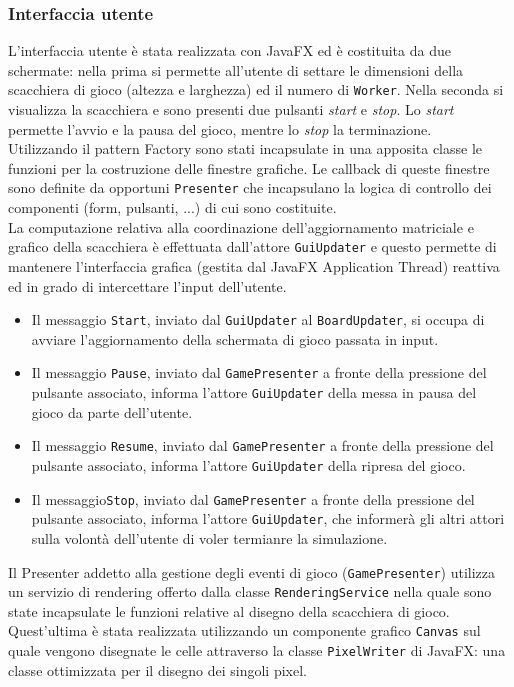 \documentclass[a4paper]{report}
\begin{document}
\subsubsection{Interfaccia utente}\label{interfaccia-utente-1}
L’interfaccia utente è stata realizzata con JavaFX ed è costituita da due schermate: nella prima si permette all’utente di settare le dimensioni della scacchiera di gioco (altezza e larghezza) ed il numero di \texttt{Worker}. Nella seconda si visualizza la scacchiera e sono presenti due pulsanti \textit{start} e \textit{stop}. Lo \textit{start} permette l’avvio e la pausa del gioco, mentre lo \textit{stop} la terminazione.\\
Utilizzando il pattern Factory sono stati incapsulate in una apposita classe le funzioni per la costruzione delle finestre grafiche. Le callback di queste finestre sono definite da opportuni \texttt{Presenter} che incapsulano la logica di controllo dei componenti (form, pulsanti, ...) di cui sono costituite.\\
La computazione relativa alla coordinazione dell’aggiornamento matriciale e grafico della scacchiera è effettuata dall'attore \texttt{GuiUpdater} e questo permette di mantenere l’interfaccia grafica (gestita dal JavaFX Application Thread) reattiva ed in grado di intercettare l’input dell’utente.

\begin{itemize}
    \item Il messaggio \texttt{Start}, inviato dal \texttt{GuiUpdater} al \texttt{BoardUpdater}, si occupa di avviare l'aggiornamento della schermata di gioco passata in input.
%
    \item Il messaggio \texttt{Pause}, inviato dal \texttt{GamePresenter} a fronte della pressione del pulsante associato, informa l'attore \texttt{GuiUpdater} della messa in pausa del gioco da parte dell'utente.
%
    \item Il messaggio \texttt{Resume}, inviato dal \texttt{GamePresenter} a fronte della pressione del pulsante associato, informa l'attore \texttt{GuiUpdater} della ripresa del gioco.
%
    \item Il messaggio\texttt{Stop}, inviato dal \texttt{GamePresenter} a fronte della pressione del pulsante associato, informa l'attore \texttt{GuiUpdater}, che informerà gli altri attori sulla volontà dell'utente di voler termianre la simulazione.
%
\end{itemize}

Il Presenter addetto alla gestione degli eventi di gioco (\texttt{GamePresenter}) utilizza un servizio di rendering offerto dalla classe \texttt{RenderingService} nella quale sono state incapsulate le funzioni relative al disegno della scacchiera di gioco.\\
Quest'ultima è stata realizzata utilizzando un componente grafico \texttt{Canvas} sul quale vengono disegnate le celle attraverso la classe \texttt{PixelWriter} di JavaFX: una classe ottimizzata per il disegno dei singoli pixel.
\end{document}
